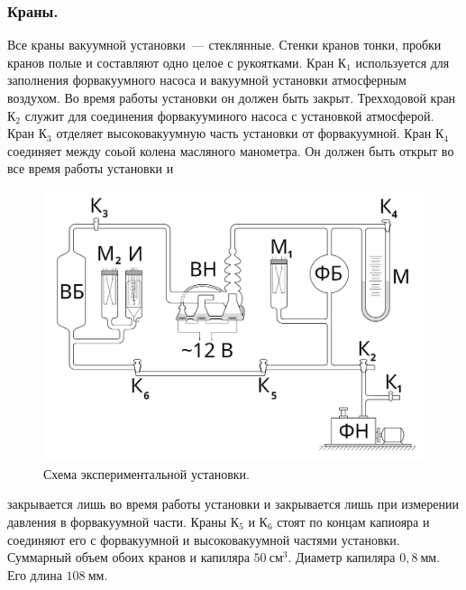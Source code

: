\documentclass[a4paper,11pt]{article}
\begin{document}
\subsubsection{Краны.}
Все краны вакуумной установки~--- стеклянные. Стенки кранов тонки, пробки кранов полые и составляют одно целое с рукоятками. Кран К$_{1}$ используется для заполнения форвакуумного насоса и вакуумной установки атмосферным воздухом. Во время работы установки он должен быть закрыт. Трехходовой кран К$_{2}$ служит для соединения форвакууминого насоса с установкой атмосферой. Кран К$_{3}$ отделяет высоковакуумную часть установки от форвакуумной. Кран К$_{4}$ соединяет между соьой колена масляного манометра. Он должен быть открыт во все время работы установки и\\
\begin{center}
\begin{figure}
  \includegraphics[scale = 0.31]{scheme1.png}
  \caption{Схема экспериментальной установки.}
  \label{fig:img1}
\end{figure}
\end{center}
закрывается лишь во время работы установки и закрывается лишь при измерении давления в форвакуумной части. Краны К$_{5}$ и К$_{6}$ стоят по концам капиояра и соединяют его с форвакуумной и высоковакуумной частями установки. Суммарный объем обоих кранов и капиляра $50\ см^{3}$. Диаметр капиляра $0,8\ мм$. Его длина $108\ мм$.
\end{document}
